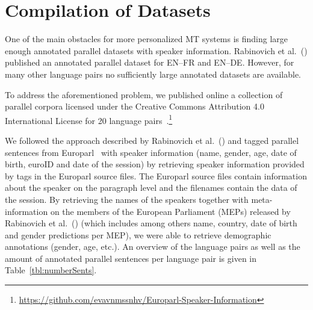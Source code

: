 \section{Compilation of Datasets}\label{sec:data}
One of the main obstacles for more personalized MT systems is finding large enough annotated parallel datasets with speaker information. Rabinovich et al.~(\citeyear{Rabinovich2016}) published an annotated parallel dataset for EN--FR and EN--DE. However, for many other language pairs no sufficiently large annotated datasets are available.

To address the aforementioned problem, we published online a collection of parallel corpora licensed under the Creative Commons Attribution 4.0 International License for 20 language pairs~\cite{Vanmassenhove2018}.\footnote{\url{https://github.com/evavnmssnhv/Europarl-Speaker-Information}} %

We followed the approach described by Rabinovich et al.~(\citeyear{Rabinovich2016}) and tagged parallel sentences from Europarl~\cite{Koehn2005} with speaker information (name, gender, age, date of birth, euroID and date of the session) by retrieving speaker information provided by tags in the Europarl source files. The Europarl source files contain information about the speaker on the paragraph level and the filenames contain the data of the session. By retrieving the names of the speakers together with meta-information on the members of the European Parliament (MEPs) released by Rabinovich et al.~(\citeyear{Rabinovich2016}) (which includes among others name, country, date of birth and gender predictions per MEP), we were able to retrieve demographic annotations (gender, age, etc.). An overview of the language pairs as well as the amount of annotated parallel sentences per language pair is given in Table~\ref{tbl:numberSents}.


